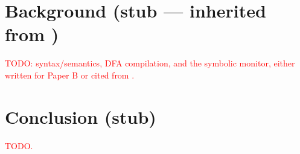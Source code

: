 \section{Background (stub --- inherited from \paperA{})}
\label{sec:ltlf}
\label{sec:symbolic}
\textcolor{red}{TODO: \ltlf syntax/semantics, DFA compilation, and the symbolic monitor,
either written for Paper B or cited from \paperA{}.}

\section{Conclusion (stub)}
\label{sec:conclusion}
\textcolor{red}{TODO.}
